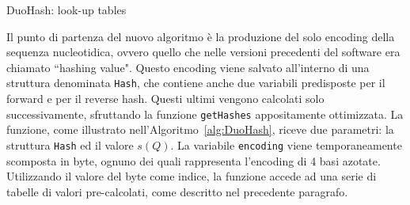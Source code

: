 \begin{algorithm}[!ht]
	\caption{DuoHash: look-up tables}
	\label{alg:DuoHash-lookup-table}
	
\end{algorithm}




Il punto di partenza del nuovo algoritmo è la produzione del solo encoding della sequenza nucleotidica, ovvero quello che nelle versioni precedenti del software era chiamato “hashing value". Questo encoding viene salvato all'interno di una struttura denominata \verb|Hash|, che contiene anche due variabili predisposte per il forward e per il reverse hash. Questi ultimi vengono calcolati solo successivamente, sfruttando la funzione \verb|getHashes| appositamente ottimizzata. La funzione, come illustrato nell'Algoritmo~\ref{alg:DuoHash}, riceve due parametri: la struttura \verb|Hash| ed il valore $s(Q)$. La variabile \verb|encoding| viene temporaneamente scomposta in byte, ognuno dei quali rappresenta l'encoding di 4 basi azotate. Utilizzando il valore del byte come indice, la funzione accede ad una serie di tabelle di valori pre-calcolati, come descritto nel precedente paragrafo.

